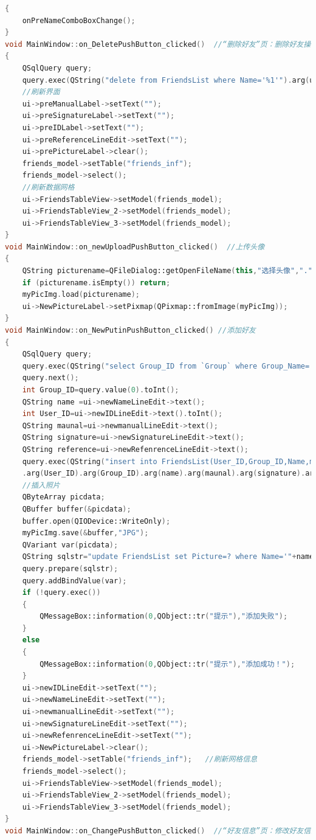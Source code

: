 \documentclass{progartcn}
\begin{document}
\begin{lstlisting}[language=c++]
{
	onPreNameComboBoxChange();
}
void MainWindow::on_DeletePushButton_clicked()  //“删除好友”页：删除好友操作
{
	QSqlQuery query;
	query.exec(QString("delete from FriendsList where Name='%1'").arg(ui->preNameComboBox->currentText()));//删除好友记录
	//刷新界面
	ui->preManualLabel->setText("");
	ui->preSignatureLabel->setText("");
	ui->preIDLabel->setText("");
	ui->preReferenceLineEdit->setText("");
	ui->prePictureLabel->clear();
	friends_model->setTable("friends_inf");
	friends_model->select();
	//刷新数据网格
	ui->FriendsTableView->setModel(friends_model);
	ui->FriendsTableView_2->setModel(friends_model);
	ui->FriendsTableView_3->setModel(friends_model);
}
void MainWindow::on_newUploadPushButton_clicked()  //上传头像
{
	QString picturename=QFileDialog::getOpenFileName(this,"选择头像",".","Image File(*.png *.jpg *.jpeg *.bmp)");
	if (picturename.isEmpty()) return;
	myPicImg.load(picturename);
	ui->NewPictureLabel->setPixmap(QPixmap::fromImage(myPicImg));
}
void MainWindow::on_NewPutinPushButton_clicked() //添加好友
{
	QSqlQuery query;
	query.exec(QString("select Group_ID from `Group` where Group_Name='%1'").arg(ui->newGroupComboBox->currentText()));
	query.next();
	int Group_ID=query.value(0).toInt();
	QString name =ui->newNameLineEdit->text();
	int User_ID=ui->newIDLineEdit->text().toInt();
	QString maunal=ui->newmanualLineEdit->text();
	QString signature=ui->newSignatureLineEdit->text();
	QString reference=ui->newRefenrenceLineEdit->text();
	query.exec(QString("insert into FriendsList(User_ID,Group_ID,Name,manual,signature,reference,Picture)values(%1,%2,'%3','%4','%5','%6',NULL)")\
	.arg(User_ID).arg(Group_ID).arg(name).arg(maunal).arg(signature).arg(reference));//添加好友信息
	//插入照片
	QByteArray picdata;
	QBuffer buffer(&picdata);
	buffer.open(QIODevice::WriteOnly);
	myPicImg.save(&buffer,"JPG");
	QVariant var(picdata);
	QString sqlstr="update FriendsList set Picture=? where Name='"+name+"'";
	query.prepare(sqlstr);
	query.addBindValue(var);
	if (!query.exec())
	{
		QMessageBox::information(0,QObject::tr("提示"),"添加失败");
	}
	else
	{
		QMessageBox::information(0,QObject::tr("提示"),"添加成功！");
	}
	ui->newIDLineEdit->setText("");
	ui->newNameLineEdit->setText("");
	ui->newmanualLineEdit->setText("");
	ui->newSignatureLineEdit->setText("");
	ui->newRefenrenceLineEdit->setText("");
	ui->NewPictureLabel->clear();
	friends_model->setTable("friends_inf");   //刷新网格信息
	friends_model->select();
	ui->FriendsTableView->setModel(friends_model);
	ui->FriendsTableView_2->setModel(friends_model);
	ui->FriendsTableView_3->setModel(friends_model);
}
void MainWindow::on_ChangePushButton_clicked()  //“好友信息”页：修改好友信息

\end{lstlisting}
\end{document}
